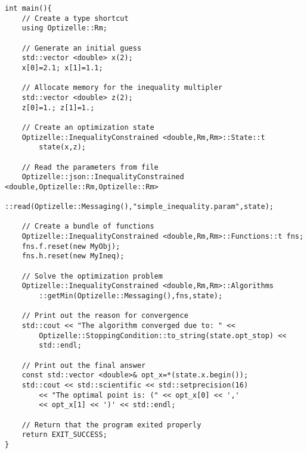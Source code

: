\begin{lstlisting}
int main(){
    // Create a type shortcut
    using Optizelle::Rm;
    
    // Generate an initial guess 
    std::vector <double> x(2);
    x[0]=2.1; x[1]=1.1;
    
    // Allocate memory for the inequality multipler 
    std::vector <double> z(2);
    z[0]=1.; z[1]=1.;
    
    // Create an optimization state
    Optizelle::InequalityConstrained <double,Rm,Rm>::State::t
        state(x,z);
    
    // Read the parameters from file
    Optizelle::json::InequalityConstrained <double,Optizelle::Rm,Optizelle::Rm>
        ::read(Optizelle::Messaging(),"simple_inequality.param",state);
    
    // Create a bundle of functions
    Optizelle::InequalityConstrained <double,Rm,Rm>::Functions::t fns;
    fns.f.reset(new MyObj);
    fns.h.reset(new MyIneq);
    
    // Solve the optimization problem
    Optizelle::InequalityConstrained <double,Rm,Rm>::Algorithms
        ::getMin(Optizelle::Messaging(),fns,state);
    
    // Print out the reason for convergence
    std::cout << "The algorithm converged due to: " <<
        Optizelle::StoppingCondition::to_string(state.opt_stop) <<
        std::endl;
    
    // Print out the final answer
    const std::vector <double>& opt_x=*(state.x.begin());
    std::cout << std::scientific << std::setprecision(16)
        << "The optimal point is: (" << opt_x[0] << ','
        << opt_x[1] << ')' << std::endl;

    // Return that the program exited properly
    return EXIT_SUCCESS;
}
\end{lstlisting}
